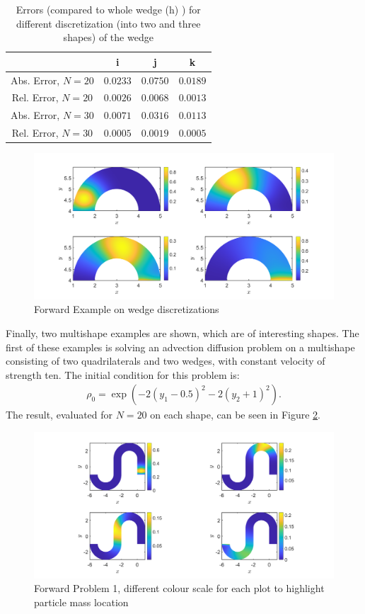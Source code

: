 \documentclass[11pt, a4paper]{article}
\theoremstyle{definition}
\begin{document}
\begin{table}
	\caption{Errors (compared to whole wedge (h) ) for different discretization (into two and three shapes) of the wedge}
	\begin{tabular}{ ||c| c| c| c|| }
		\hline
		\hline
		& i & j &k\\ 
		\hline
		Abs. Error, $N =20$& $0.0233 $ & $0.0750 $ & $0.0189 $ \\  
		Rel. Error, $N =20$& $0.0026 $& $0.0068 $ &$0.0013 $ \\
		Abs. Error, $N =30$& $0.0071 $ & $0.0316 $ & $0.0113 $  \\  
		Rel. Error, $N =30$ & $0.0005 $& $0.0019 $ &$ 0.0005$  \\
		\hline
		\hline
	\end{tabular}
	\label{Tab4:ErrorsFWWedge}
\end{table}
\begin{figure}[h]
	\centering
	\includegraphics[scale=0.35]{FWWedge.png}
	\caption{Forward Example on wedge discretizations} 
	\label{FFW2}
\end{figure}



Finally, two multishape examples are shown, which are of interesting shapes.
The first of these examples is solving an advection diffusion problem on a multishape consisting of two quadrilaterals and two wedges, with constant velocity of strength ten. The initial condition for this problem is:
 \begin{align*}
 	\rho_0 = \exp( -2(y_1 -0.5)^2 - 2 (y_2 + 1)^2).
 \end{align*}
The result, evaluated for $N= 20$ on each shape, can be seen in Figure \ref{F8}.

\begin{figure}[h]
	\centering
	\includegraphics[scale=0.35]{ex1.png}
	\caption{Forward Problem 1, different colour scale for each plot to highlight particle mass location}
	\label{F8}
\end{figure}
\end{document}
